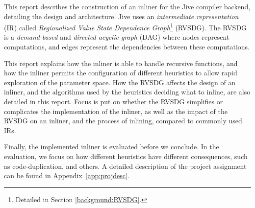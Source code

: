 This report describes the construction of an inliner for the Jive compiler
backend, detailing the design and architecture. Jive uses an
\textit{intermediate representation} (IR) called \textit{Regionalized Value
State Dependence Graph}\footnote{Detailed in Section \ref{background:RVSDG}.}
(RVSDG). The RVSDG\cite{RVSDG:HiPEACpaper} is a \textit{demand-based} and
\textit{directed acyclic graph} (DAG) where nodes represent computations, and
edges represent the dependencies between these computations.


This report explains how the inliner is able to handle recursive functions, and
how the inliner permits the configuration of different heuristics to allow rapid
exploration of the parameter space. How the RVSDG affects the design of an
inliner, and the algorithms used by the heuristics deciding what to inline, are
also detailed in this report. Focus is put on whether the RVSDG simplifies or
complicates the implementation of the inliner, as well as the impact of the
RVSDG on an inliner, and the process of inlining, compared to commonly used IRs.

Finally, the implemented inliner is evaluated before we conclude. In the
evaluation, we focus on how different heuristics have different consequences,
such as code-duplication, and others. A detailed description of the project
assignment can be found in Appendix~\ref{app:projdesc}.
